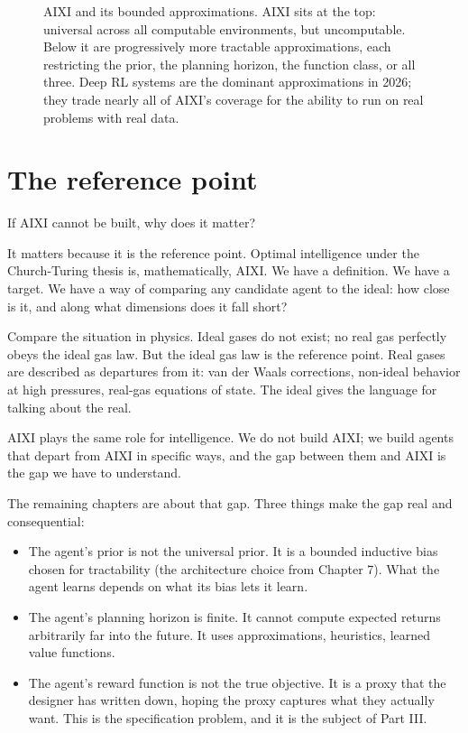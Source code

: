 \begin{figure}[h]
\caption{AIXI and its bounded approximations. AIXI sits at the top: universal across all computable environments, but uncomputable. Below it are progressively more tractable approximations, each restricting the prior, the planning horizon, the function class, or all three. Deep RL systems are the dominant approximations in 2026; they trade nearly all of AIXI's coverage for the ability to run on real problems with real data.}
\label{fig:aixi-ladder}
\end{figure}

\section*{The reference point}

If AIXI cannot be built, why does it matter?

It matters because it is the reference point. Optimal intelligence under the Church-Turing thesis is, mathematically, AIXI. We have a definition. We have a target. We have a way of comparing any candidate agent to the ideal: how close is it, and along what dimensions does it fall short?

Compare the situation in physics. Ideal gases do not exist; no real gas perfectly obeys the ideal gas law. But the ideal gas law is the reference point. Real gases are described as departures from it: van der Waals corrections, non-ideal behavior at high pressures, real-gas equations of state. The ideal gives the language for talking about the real.

AIXI plays the same role for intelligence. We do not build AIXI; we build agents that depart from AIXI in specific ways, and the gap between them and AIXI is the gap we have to understand.

The remaining chapters are about that gap. Three things make the gap real and consequential:

\begin{itemize}
\item The agent's prior is not the universal prior. It is a bounded inductive bias chosen for tractability (the architecture choice from Chapter 7). What the agent learns depends on what its bias lets it learn.
\item The agent's planning horizon is finite. It cannot compute expected returns arbitrarily far into the future. It uses approximations, heuristics, learned value functions.
\item The agent's reward function is not the true objective. It is a proxy that the designer has written down, hoping the proxy captures what they actually want. This is the specification problem, and it is the subject of Part III.
\end{itemize}

